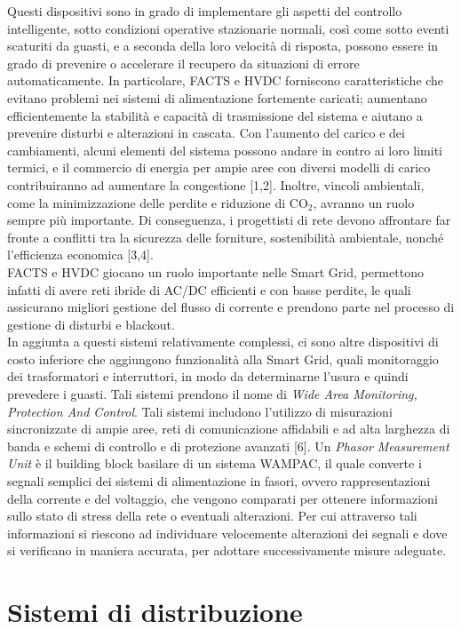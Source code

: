 Questi dispositivi sono in grado di implementare gli aspetti del controllo intelligente, sotto condizioni operative stazionarie normali, così come sotto eventi scaturiti da guasti, e a seconda della loro  velocità di risposta, possono essere in grado di prevenire o accelerare il recupero da situazioni di errore automaticamente. In particolare, FACTS e HVDC forniscono caratteristiche che evitano problemi nei sistemi di alimentazione fortemente caricati; aumentano efficientemente la stabilità e capacità di trasmissione del sistema e aiutano a prevenire disturbi e alterazioni in cascata. Con l'aumento del carico e dei cambiamenti, alcuni elementi del sistema possono andare in contro ai loro limiti termici, e il commercio di energia per ampie aree con diversi modelli di carico contribuiranno ad aumentare la congestione [1,2]. Inoltre, vincoli ambientali, come la minimizzazione delle perdite e riduzione di CO$_2$, avranno un ruolo sempre più importante. Di conseguenza, i progettisti di rete devono affrontare far fronte a conflitti tra la sicurezza delle forniture, sostenibilità ambientale, nonché l'efficienza economica [3,4].
\\
FACTS e HVDC giocano un ruolo importante nelle Smart Grid, permettono infatti di avere reti ibride di AC/DC efficienti e con basse perdite, le quali assicurano migliori gestione del flusso di corrente e prendono parte nel processo di gestione di disturbi e blackout.
\\ 
In aggiunta a questi sistemi relativamente complessi, ci sono altre dispositivi di costo inferiore che aggiungono funzionalità alla Smart Grid, quali monitoraggio dei trasformatori e interruttori, in modo da determinarne l'usura e quindi prevedere i guasti. Tali sistemi prendono il nome di \emph{Wide Area Monitoring, Protection And Control}. Tali sistemi includono l'utilizzo di misurazioni sincronizzate di ampie aree, reti di comunicazione affidabili e ad alta larghezza di banda e schemi di controllo e di protezione avanzati [6].  Un \emph{Phasor Measurement Unit} è il building block basilare di un sistema WAMPAC, il quale converte i segnali semplici dei sistemi di alimentazione in fasori, ovvero rappresentazioni della corrente e del voltaggio, che vengono comparati per ottenere informazioni sullo stato di stress della rete o eventuali alterazioni. Per cui attraverso tali informazioni si riescono ad individuare velocemente alterazioni dei segnali e dove si verificano in maniera accurata, per adottare successivamente misure adeguate.

\section{Sistemi di distribuzione}%

